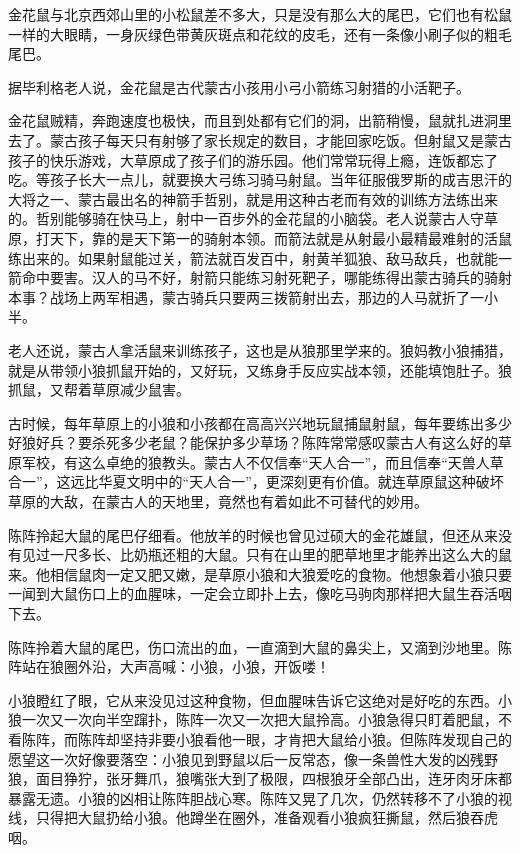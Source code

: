 \par 金花鼠与北京西郊山里的小松鼠差不多大，只是没有那么大的尾巴，它们也有松鼠一样的大眼睛，一身灰绿色带黄灰斑点和花纹的皮毛，还有一条像小刷子似的粗毛尾巴。
\par 据毕利格老人说，金花鼠是古代蒙古小孩用小弓小箭练习射猎的小活靶子。
\par 金花鼠贼精，奔跑速度也极快，而且到处都有它们的洞，出箭稍慢，鼠就扎进洞里去了。蒙古孩子每天只有射够了家长规定的数目，才能回家吃饭。但射鼠又是蒙古孩子的快乐游戏，大草原成了孩子们的游乐园。他们常常玩得上瘾，连饭都忘了吃。等孩子长大一点儿，就要换大弓练习骑马射鼠。当年征服俄罗斯的成吉思汗的大将之一、蒙古最出名的神箭手哲别，就是用这种古老而有效的训练方法练出来的。哲别能够骑在快马上，射中一百步外的金花鼠的小脑袋。老人说蒙古人守草原，打天下，靠的是天下第一的骑射本领。而箭法就是从射最小最精最难射的活鼠练出来的。如果射鼠能过关，箭法就百发百中，射黄羊狐狼、敌马敌兵，也就能一箭命中要害。汉人的马不好，射箭只能练习射死靶子，哪能练得出蒙古骑兵的骑射本事？战场上两军相遇，蒙古骑兵只要两三拨箭射出去，那边的人马就折了一小半。
\par 老人还说，蒙古人拿活鼠来训练孩子，这也是从狼那里学来的。狼妈教小狼捕猎，就是从带领小狼抓鼠开始的，又好玩，又练身手反应实战本领，还能填饱肚子。狼抓鼠，又帮着草原减少鼠害。
\par 古时候，每年草原上的小狼和小孩都在高高兴兴地玩鼠捕鼠射鼠，每年要练出多少好狼好兵？要杀死多少老鼠？能保护多少草场？陈阵常常感叹蒙古人有这么好的草原军校，有这么卓绝的狼教头。蒙古人不仅信奉“天人合一”，而且信奉“天兽人草合一”，这远比华夏文明中的“天人合一”，更深刻更有价值。就连草原鼠这种破坏草原的大敌，在蒙古人的天地里，竟然也有着如此不可替代的妙用。
\par 陈阵拎起大鼠的尾巴仔细看。他放羊的时候也曾见过硕大的金花雄鼠，但还从来没有见过一尺多长、比奶瓶还粗的大鼠。只有在山里的肥草地里才能养出这么大的鼠来。他相信鼠肉一定又肥又嫩，是草原小狼和大狼爱吃的食物。他想象着小狼只要一闻到大鼠伤口上的血腥味，一定会立即扑上去，像吃马驹肉那样把大鼠生吞活咽下去。
\par 
\par 陈阵拎着大鼠的尾巴，伤口流出的血，一直滴到大鼠的鼻尖上，又滴到沙地里。陈阵站在狼圈外沿，大声高喊：小狼，小狼，开饭喽！
\par 小狼瞪红了眼，它从来没见过这种食物，但血腥味告诉它这绝对是好吃的东西。小狼一次又一次向半空蹿扑，陈阵一次又一次把大鼠拎高。小狼急得只盯着肥鼠，不看陈阵，而陈阵却坚持非要小狼看他一眼，才肯把大鼠给小狼。但陈阵发现自己的愿望这一次好像要落空：小狼见到野鼠以后一反常态，像一条兽性大发的凶残野狼，面目狰狞，张牙舞爪，狼嘴张大到了极限，四根狼牙全部凸出，连牙肉牙床都暴露无遗。小狼的凶相让陈阵胆战心寒。陈阵又晃了几次，仍然转移不了小狼的视线，只得把大鼠扔给小狼。他蹲坐在圈外，准备观看小狼疯狂撕鼠，然后狼吞虎咽。
